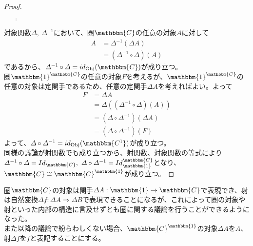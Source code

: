 \documentclass[uplatex,dvipdfmx]{jsarticle}
\newcommand{\cat}[1]{\mathbbm{#1}}
\newcommand{\arrow}{\rightarrow}
\newcommand{\functor}[3]{#1:\cat{#2}\arrow \cat{#3}}
\newcommand{\nat}[3]{#1:#2\Rightarrow #3}
\newcommand{\obj}[1]{\mathrm{Obj}(\cat{#1})}
\newcommand{\funccat}[2]{\cat{#2}^\cat{#1}}
\newtheorem{proof}{証明}[section]
\numberwithin{proof}{subsection}
\newenvironment{mydescription}
{\begin{description}
  \setlength{\parskip}{0.5cm}
}
{\end{description}}
\begin{document}
\begin{proof}
\begin{quote}
\begin{mydescription}
\begin{align*}
        \end{align*}
			\end{mydescription}
		\end{quote}
    対象関数$\varDelta,\ \varDelta^{-1}$において、圏$\cat{C}$の任意の対象$A$に対して
    \begin{align*}
      A&=\varDelta^{-1}(\varDelta A)\\
      &=(\varDelta^{-1}\circ\varDelta)(A)
    \end{align*}
    であるから、$\varDelta^{-1}\circ\varDelta=id_\obj{C}$が成り立つ。\\
    圏$\funccat{C}{1}$の任意の対象$F$を考えるが、$\funccat{C}{1}$の任意の対象は定関手であるため、任意の定関手$\varDelta A$を考えればよい。よって
    \begin{align*}
      F&=\varDelta A\\
      &=\varDelta((\varDelta^{-1}\circ\varDelta)(A))\\
      &=(\varDelta\circ \varDelta^{-1})(\varDelta A)\\
      &=(\varDelta\circ \varDelta^{-1})(F)
    \end{align*}
    よって、$\varDelta\circ\varDelta^{-1}=id_\obj{C^1}$が成り立つ。\\
    同様の議論が射関数でも成り立つから、射関数、対象関数の等式により$\varDelta^{-1}\circ\varDelta=Id_\cat{C},\ \varDelta\circ\varDelta^{-1}=Id_\funccat{C}{1}$となり、$\cat{C}\cong\funccat{1}{C}$が成り立つ。
  \end{proof}
  圏$\cat{C}$の対象は関手$\functor{\varDelta A}{1}{C}$で表現でき、射は自然変換$\nat{\varDelta f}{\varDelta A}{\varDelta B}$で表現できることになるが、これによって圏の対象や射といった内部の構造に言及せずとも圏に関する議論を行うことができるようになった。\\
  また以降の議論で紛らわしくない場合、$\funccat{1}{C}$の対象$\varDelta A$を$A$、射$\varDelta f$を$f$と表記することにする。
\end{document}
